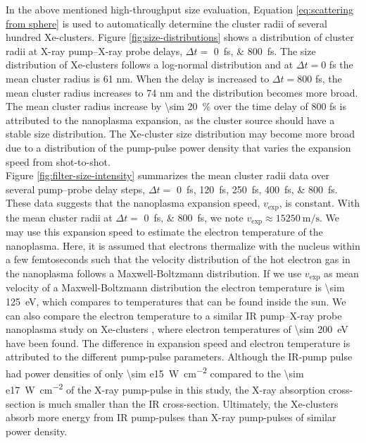 In the above mentioned high-throughput size evaluation, Equation \eqref{eq:scattering from sphere} is used to automatically determine the cluster radii of several hundred Xe-clusters. Figure \ref{fig:size-distributions} shows a distribution of cluster radii at X-ray pump--X-ray probe delays, $\Delta t =$ \SIlist{0;800}{\femto\second}. The size distribution of Xe-clusters follows a log-normal distribution \citep{Schutte-2002-IJMS} and at $\Delta t=0$ fs the mean cluster radius is 61 nm. When the delay is increased to $\Delta t=800$ fs, the mean cluster radius increases to 74 nm and the distribution becomes more broad. The mean cluster radius increase by \SI{\sim 20}{\percent} over the time delay of 800 fs is attributed to the nanoplasma expansion, as the cluster source should have a stable size distribution. The Xe-cluster size distribution may become more broad due to a distribution of the pump-pulse power density that varies the expansion speed from shot-to-shot.\\[1\baselineskip]
%
Figure \ref{fig:filter-size-intensity} summarizes the mean cluster radii data over several pump--probe delay steps, $\Delta t=$ \SIlist{0;120;250;400;800}{\femto\second}. These data suggests that the nanoplasma expansion speed, $v_{\text{exp}}$, is constant. With the mean cluster radii at $\Delta t=$ \SIlist{0;800}{\femto\second}, we note $v_{\text{exp}}\approx \SI{15250}{\meter\per\second}$. We may use this expansion speed to estimate the electron temperature of the nanoplasma. Here, it is assumed that electrons thermalize with the nucleus within a few femtoseconds such that the velocity distribution of the hot electron gas in the nanoplasma follows a Maxwell-Boltzmann distribution. If we use $v_{\text{exp}}$ as mean velocity of a Maxwell-Boltzmann distribution the electron temperature is \SI{\sim 125}{\electronvolt}, which compares to temperatures that can be found inside the sun. We can also compare the electron temperature to a similar IR pump--X-ray probe nanoplasma study on Xe-clusters \citep{Gorkhover-2016-NatPho}, where electron temperatures of \SI{\sim 200}{\electronvolt} have been found. The difference in expansion speed and electron temperature is attributed to the different pump-pulse parameters. Although the IR-pump pulse had power densities of only \SI{\sim e15}{\watt\per\square\centi\meter} compared to the \SI{\sim e17}{\watt\per\square\centi\meter} of the X-ray pump-pulse in this study, the X-ray absorption cross-section is much smaller than the IR cross-section. Ultimately, the Xe-clusters absorb more energy from IR pump-pulses than X-ray pump-pulses of similar power density.\\[1\baselineskip]
